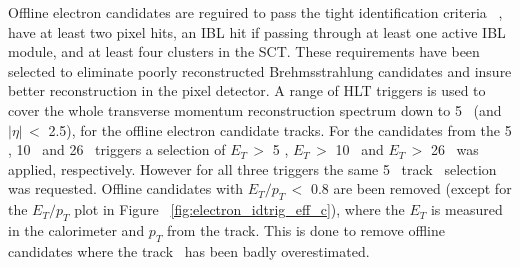 		Offline electron candidates are reguired to pass the tight identification criteria ~\cite{Aaboud_2019}, have at least two pixel hits, an \ac{IBL} hit if passing through at least one active \ac{IBL} module, and at least four clusters in the \ac{SCT}. These requirements have been selected to eliminate poorly reconstructed Brehmsstrahlung candidates and insure better reconstruction in the pixel detector.
		 A range of \ac{HLT} triggers is used to cover the whole transverse momentum reconstruction spectrum down to 5 \gev\ (and $|\eta|\,<$ 2.5), for the offline electron candidate tracks. 
		 For the candidates from the 5 \gev, 10 \gev\ and 26 \gev\ triggers a selection of $E_T\,>$ 5 \gev, $E_T\,>$ 10 \gev\  and $E_T\,>$ 26 \gev\ was applied, respectively. However for all three triggers the same 5 \gev\ track \pt\ selection was requested. 
		Offline candidates with $E_T/p_T\,<$ 0.8 are been removed (except for the $E_T/p_T$ plot in Figure ~\ref{fig:electron_idtrig_eff_c}), where the $E_T$ is measured in the calorimeter and $p_T$ from the track. This is done to remove offline candidates where the track \pt\ has been badly overestimated.
		
